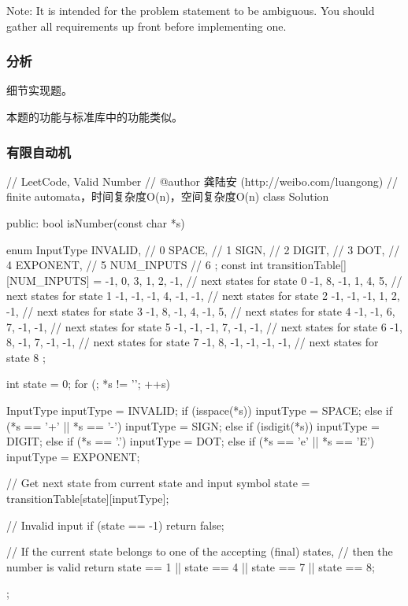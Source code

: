 Note: It is intended for the problem statement to be ambiguous. You should gather all requirements up front before implementing one.


\subsubsection{分析}
细节实现题。

本题的功能与标准库中的功能类似。


\subsubsection{有限自动机}
\begin{Code}
// LeetCode, Valid Number
// @author 龚陆安 (http://weibo.com/luangong)
// finite automata，时间复杂度O(n)，空间复杂度O(n)
class Solution {
public:
    bool isNumber(const char *s) {
        enum InputType {
            INVALID,    // 0
            SPACE,      // 1
            SIGN,       // 2
            DIGIT,      // 3
            DOT,        // 4
            EXPONENT,   // 5
            NUM_INPUTS  // 6
        };
        const int transitionTable[][NUM_INPUTS] = {
                -1, 0, 3, 1, 2, -1, // next states for state 0
                -1, 8, -1, 1, 4, 5,     // next states for state 1
                -1, -1, -1, 4, -1, -1,     // next states for state 2
                -1, -1, -1, 1, 2, -1,     // next states for state 3
                -1, 8, -1, 4, -1, 5,     // next states for state 4
                -1, -1, 6, 7, -1, -1,     // next states for state 5
                -1, -1, -1, 7, -1, -1,     // next states for state 6
                -1, 8, -1, 7, -1, -1,     // next states for state 7
                -1, 8, -1, -1, -1, -1,     // next states for state 8
                };

        int state = 0;
        for (; *s != '\0'; ++s) {
            InputType inputType = INVALID;
            if (isspace(*s))
                inputType = SPACE;
            else if (*s == '+' || *s == '-')
                inputType = SIGN;
            else if (isdigit(*s))
                inputType = DIGIT;
            else if (*s == '.')
                inputType = DOT;
            else if (*s == 'e' || *s == 'E')
                inputType = EXPONENT;

            // Get next state from current state and input symbol
            state = transitionTable[state][inputType];

            // Invalid input
            if (state == -1) return false;
        }
        // If the current state belongs to one of the accepting (final) states,
        // then the number is valid
        return state == 1 || state == 4 || state == 7 || state == 8;

    }
};
\end{Code}



